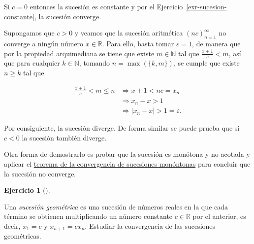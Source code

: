 \documentclass[
  spanish,
  a4paper,
]{scrreport}
\theoremstyle{definition}
\newtheorem{exercise}{Ejercicio}[chapter]
\theoremstyle{remark}
\begin{document}
\begin{tcolorbox}[enhanced jigsaw, arc=.35mm, bottomrule=.15mm, bottomtitle=1mm, breakable, colback=white, colbacktitle=quarto-callout-tip-color!10!white, colframe=quarto-callout-tip-color-frame, coltitle=black, left=2mm, leftrule=.75mm, opacityback=0, opacitybacktitle=0.6, rightrule=.15mm, title=\textcolor{quarto-callout-tip-color}{\faLightbulb}\hspace{0.5em}{Solución}, titlerule=0mm, toprule=.15mm, toptitle=1mm]

Si \(c=0\) entonces la sucesión es constante y por el
Ejercicio~\ref{exr-sucesion-constante}, la sucesión converge.

Supongamos que \(c>0\) y veamos que la sucesión aritmética
\((nc)_{n=1}^\infty\) no converge a ningún número \(x\in\mathbb{R}\).
Para ello, basta tomar \(\varepsilon=1\), de manera que por la propiedad
arquimediana se tiene que existe \(m\in\mathbb{N}\) tal que
\(\frac{x+1}{c}<m\), así que para cualquier \(k\in\mathbb{N}\), tomando
\(n=\max(\{k,m\})\), se cumple que existe \(n\geq k\) tal que

\begin{align*}
\frac{x+1}{c}<m\leq n &\Rightarrow x+1 < nc = x_n\\  
&\Rightarrow x_n-x > 1\\ 
&\Rightarrow |x_n-x|>1=\varepsilon.
\end{align*}

Por consiguiente, la sucesión diverge. De forma similar se puede prueba
que si \(c<0\) la sucesión también diverge.

Otra forma de demostrarlo es probar que la sucesión es monótona y no
acotada y aplicar el
\href{https://aprendeconalf.es/analisis-manual/sucesiones.html\#thm-convergencia-monotona}{teorema
de la convergencia de sucesiones monóntonas} para concluir que la
sucesión no converge.

\end{tcolorbox}

\begin{exercise}[]\protect\hypertarget{exr-sucesion-geométrica}{}\label{exr-sucesion-geométrica}

Una \emph{sucesión geométrica} es una sucesión de números reales en la
que cada término se obtienen multiplicando un número constante
\(c\in\mathbb{R}\) por el anterior, es decir, \(x_1=c\) y
\(x_{n+1} = cx_n\). Estudiar la convergencia de las sucesiones
geométricas.

\end{exercise}
\end{document}
